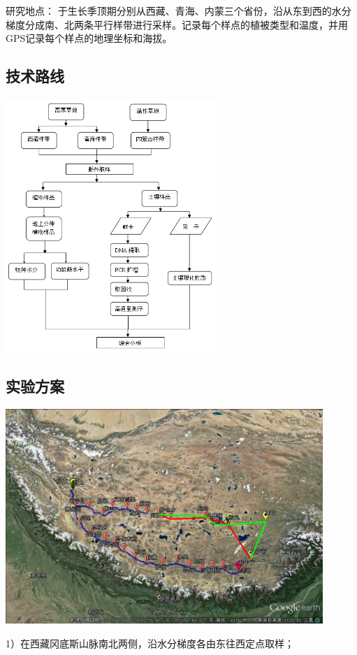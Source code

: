 \begin{frame}{\insertsection}{\insertsubsection}
	研究地点：
	于生长季顶期分别从西藏、青海、内蒙三个省份，沿从东到西的水分梯度分成南、北两条平行样带进行采样。记录每个样点的植被类型和温度，并用GPS记录每个样点的地理坐标和海拔。
\end{frame}
\subsection{技术路线}
\begin{frame}{\insertsection}{\insertsubsection}
	\begin{center}
		\includegraphics[width = 0.6\textwidth]{./pic/技术路线.jpg}
	\end{center}
\end{frame}
\subsection{实验方案}
\begin{frame}{\insertsection}{\insertsubsection}
	\begin{center}
		\includegraphics[width = 0.9\textwidth]{./pic/西藏瓦岗.jpg}
	\end{center}
	1）在西藏冈底斯山脉南北两侧，沿水分梯度各由东往西定点取样；
\end{frame}


